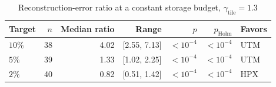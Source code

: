 \begin{table}[t]
\centering
\caption{Reconstruction-error ratio at a constant storage budget, $\gamma_{\mathrm{tile}}=1.3$}
\label{tab:error_at_size}
\footnotesize
\setlength{\tabcolsep}{3pt}
\begin{tabular}{lrrrrrl}
\toprule
Target & $n$ & Median ratio & Range & $p$ & $p_{\mathrm{Holm}}$ & Favors \\
\midrule
$10\%$ & 38 & 4.02 & [2.55, 7.13] & $<10^{-4}$ & $<10^{-4}$ & UTM \\
$5\%$ & 39 & 1.33 & [1.02, 2.25] & $<10^{-4}$ & $<10^{-4}$ & UTM \\
$2\%$ & 40 & 0.82 & [0.51, 1.42] & $<10^{-4}$ & $<10^{-4}$ & HPX \\
\bottomrule
\end{tabular}
\end{table}
